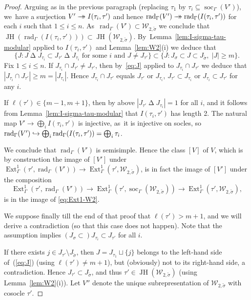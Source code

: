 \documentclass[JEP,XML,SOM,Unicode,NoFloatCountersInSection, NoEqCountersInSection,published]{cedram}
\newcommand\hto{\mathrel{\lhook\joinrel\to}}
\newcommand{\onto}{\mathchoice{\to\hspace*{-5mm}\to}{\mathrel{\hbox{$\to\hspace*{-2.85mm}\to$}}}{\to\hspace*{-3mm}\to}{\to\hspace*{-3mm}\to}}
\let\wt\widetilde
\DeclareMathOperator{\Ext}{Ext}
\DeclareMathOperator{\JH}{\mathrm{JH}}
\DeclareMathOperator{\rad}{rad}
\DeclareMathOperator{\soc}{soc}
\theoremstyle{plain}
\theoremstyle{definition}
\begin{document}
\begin{proof}
Arguing as in the previous paragraph (replacing $\tau_1$ by $\tau_i\subseteq \soc_\Gamma(V')$), we~have a surjection $V'\onto I(\tau_i,\tau')$ and hence $\rad_\Gamma(V')\onto \rad_\Gamma(I(\tau_i,\tau'))$ for each $i$ such that $1 \le i \le n$. As~$\rad_\Gamma(V') \subset \mathcal{W}_{2,\wt\sigma}$ we conclude that $\JH(\rad_\Gamma(I(\tau_i,\tau'))) \subset \JH(\mathcal{W}_{2,\wt\sigma})$. By~Lemma~\ref{lem:I-sigma-tau-modular} applied to $I(\tau_i,\tau')$ and Lemma~\ref{lem:W2}(i) we deduce that
\begin{equation}\label{eq:J}
\{ J: J \mathbin\Delta J_{\tau_i} \subset J_{\tau'} \mathbin\Delta J_{\tau_i} \text{\ for some $i$ and $J \ne J_{\tau'}$} \} \subset \{ J: J_\sigma \subset J \subset J_{\wt\sigma},\; |J| \ge m \}.
\end{equation}
Fix $1 \le i \le n$.
If $J_{\tau_i} \cap J_{\tau'}\neq J_{\tau'}$, then by~\eqref{eq:J} applied to $J_{\tau_i} \cap J_{\tau'}$ we deduce that $|J_{\tau_i} \cap J_{\tau'}|\geq m=|J_{\tau_i}|$.
Hence $J_{\tau_i} \cap J_{\tau'}$ equals $J_{\tau'}$ or $J_{\tau_i}$, \ie
$J_{\tau'} \subset J_{\tau_i}$ or $J_{\tau_i} \subset J_{\tau'}$ for any $i$.

If $\ell(\tau') \in \{m-1,m+1\}$, then by above $|J_{\tau'} \mathbin\Delta J_{\tau_i}| = 1$ for all $i$, and it follows from Lemma~\ref{lem:I-sigma-tau-modular} that $I(\tau_i,\tau')$ has length 2.
The natural map $V'\to \bigoplus_i I(\tau_i,\tau')$ is injective, as~it is injective on socles, so~$\rad_\Gamma(V') \hto \bigoplus_i \rad_\Gamma(I(\tau_i,\tau')) = \bigoplus_i \tau_i$.

We conclude that $\rad_\Gamma(V')$ is semisimple. Hence the class $[V]$ of $V$, which is by construction the image of $[V']$ under $\Ext^1_{\Gamma}(\tau',\rad_\Gamma(V'))\to \Ext^1_{\Gamma}(\tau',\mathcal{W}_{2,\wt{\sigma}})$, is in fact the image of $[V']$ under the composition
\begin{equation*}
\Ext^1_{\Gamma}(\tau',\rad_\Gamma(V'))\to \Ext^1_{\Gamma}(\tau',\soc_\Gamma(\mathcal{W}_{2,\wt{\sigma}})) \to \Ext^1_{\Gamma}(\tau',\mathcal{W}_{2,\wt{\sigma}}),
\end{equation*}
\ie is in the image of \eqref{eq:Ext1-W2}.

We suppose finally till the end of that proof that $\ell(\tau') > m+1$, and we will derive a contradiction (so that this case does not happen).
Note that the assumption implies $(J_\sigma \subset{}) J_{\tau_i} \subset J_{\tau'}$ for all $i$.

If there exists $j \in J_{\tau'} \setminus J_{\wt\sigma}$, then $J = J_{\tau_1} \sqcup \{j\}$ belongs to the left-hand side of~(\ref{eq:J}) (using $\ell(\tau') \ne m+1$), but (obviously) not to its right-hand side, a contradiction.
Hence $J_{\tau'} \subset J_{\wt\sigma}$, and thus $\tau' \in \JH(\mathcal{W}_{2,\wt\sigma})$ (using Lemma~\ref{lem:W2}(i)).
Let $V''$ denote the unique subrepresentation of $\mathcal{W}_{2,\wt\sigma}$ with cosocle $\tau'$.


\end{proof}
\end{document}
